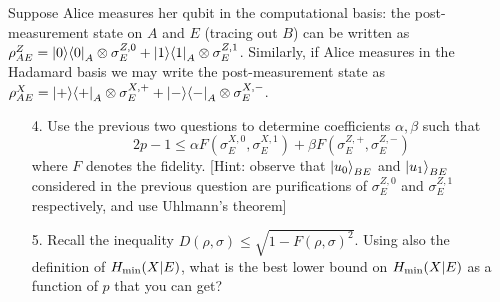 \documentclass[12pt]{article}
\begin{document}
\begin{enumerate}
Suppose Alice measures her qubit in the computational basis: the post-measurement state on $A$ and $E$ (tracing out $B$) can be written as $\rho_{AE}^Z = \ket{0}\!\bra{0}_A\otimes \sigma_E^{Z,0} + \ket{1}\!\bra{1}_A\otimes \sigma_E^{Z,1}$. Similarly, if Alice measures in the Hadamard basis we may write the post-measurement state as $\rho_{AE}^X = \ket{+}\!\bra{+}_A\otimes \sigma_E^{X,+} + \ket{-}\!\bra{-}_A\otimes \sigma_E^{X,-}$.
\begin{enumerate}
\item[4.] Use the previous two questions to determine coefficients $\alpha,\beta$ such that
$$ 2p-1 \leq \alpha F(\sigma_E^{X,0},\sigma_E^{X,1}) + \beta F(\sigma_E^{Z,+},\sigma_E^{Z,-})$$
where $F$ denotes the fidelity. [Hint: observe that $\ket{u_0}_{BE}$ and $\ket{u_1}_{BE}$ considered in the previous question are purifications of $\sigma_E^{Z,0}$ and $\sigma_E^{Z,1}$ respectively, and use Uhlmann's theorem]
\item[5.] Recall the inequality $D(\rho,\sigma) \leq \sqrt{1-F(\rho,\sigma)^2}$. Using also the definition of $H_{\rm min} (X|E)$, what is the best lower bound on $H_{\rm min}(X|E)$ as a function of $p$ that you can get?

\end{enumerate}
\end{enumerate}
\end{document}
